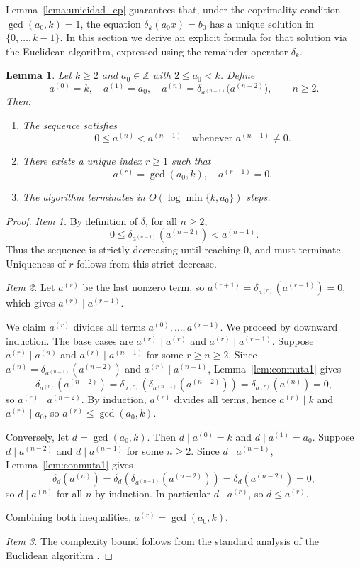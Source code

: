 \documentclass[12pt]{article}
\newtheorem{lemma}[theorem]{Lemma}
\begin{document}
Lemma~\ref{lema:unicidad_ep} guarantees that, under the coprimality
condition $\gcd(a_0,k)=1$, the equation $\delta_k(a_0 x)=b_0$ has
a unique solution in $\{0,\dots,k-1\}$. In this section we derive
an explicit formula for that solution via the Euclidean algorithm,
expressed using the remainder operator $\delta_k$.


\begin{lemma}\label{lem_eu}
Let $k \ge 2$ and $a_0 \in \mathbb{Z}$ with $2 \le a_0 < k$. Define
\[
a^{(0)} = k,
\quad
a^{(1)} = a_0,
\quad
a^{(n)} =
\delta_{a^{(n-1)}}\!\bigl(a^{(n-2)}\bigr),
\qquad n \ge 2.
\]
Then:
\begin{enumerate}
\item The sequence satisfies
\[
0 \le a^{(n)} < a^{(n-1)}
\quad \text{whenever } a^{(n-1)} \ne 0.
\]
\item There exists a unique index $r \ge 1$ such that
\[
a^{(r)} = \gcd(a_0,k),
\quad
a^{(r+1)} = 0.
\]
\item The algorithm terminates in $O(\log\min\{k,a_0\})$ steps.
\end{enumerate}
\end{lemma}

\begin{proof}
\textit{Item 1.} By definition of $\delta$, for all $n \ge 2$,
\[
0 \le \delta_{a^{(n-1)}}(a^{(n-2)}) < a^{(n-1)}.
\]
Thus the sequence is strictly decreasing until reaching $0$, and must
terminate. Uniqueness of $r$ follows from this strict decrease.

\textit{Item 2.}
Let $a^{(r)}$ be the last nonzero term, so $a^{(r+1)} = 
\delta_{a^{(r)}}(a^{(r-1)}) = 0$, which gives $a^{(r)} \mid a^{(r-1)}$.

We claim $a^{(r)}$ divides all terms $a^{(0)}, \dots, a^{(r-1)}$.
We proceed by downward induction. The base cases are
$a^{(r)} \mid a^{(r)}$ and $a^{(r)} \mid a^{(r-1)}$.
Suppose $a^{(r)} \mid a^{(n)}$ and $a^{(r)} \mid a^{(n-1)}$ for some
$r \ge n \ge 2$. Since $a^{(n)} = \delta_{a^{(n-1)}}(a^{(n-2)})$ and
$a^{(r)} \mid a^{(n-1)}$, Lemma~\ref{lem:conmuta1} gives
\[
\delta_{a^{(r)}}\!\left(a^{(n-2)}\right)
= \delta_{a^{(r)}}\!\left(\delta_{a^{(n-1)}}(a^{(n-2)})\right)
= \delta_{a^{(r)}}\!\left(a^{(n)}\right) = 0,
\]
so $a^{(r)} \mid a^{(n-2)}$. By induction, $a^{(r)}$ divides all terms,
hence $a^{(r)} \mid k$ and $a^{(r)} \mid a_0$,
so $a^{(r)} \le \gcd(a_0,k)$.

Conversely, let $d = \gcd(a_0,k)$. Then $d \mid a^{(0)} = k$ and
$d \mid a^{(1)} = a_0$. Suppose $d \mid a^{(n-2)}$ and $d \mid a^{(n-1)}$
for some $n \ge 2$. Since $d \mid a^{(n-1)}$, Lemma~\ref{lem:conmuta1}
gives
\[
\delta_{d}\!\left(a^{(n)}\right)
= \delta_{d}\!\left(\delta_{a^{(n-1)}}(a^{(n-2)})\right)
= \delta_{d}\!\left(a^{(n-2)}\right) = 0,
\]
so $d \mid a^{(n)}$ for all $n$ by induction. In particular
$d \mid a^{(r)}$, so $d \le a^{(r)}$.

Combining both inequalities, $a^{(r)} = \gcd(a_0,k)$.

\textit{Item 3.}
The complexity bound follows from the standard analysis of the Euclidean
algorithm \cite{BrentZimmermann2010}.
\end{proof}
\end{document}
